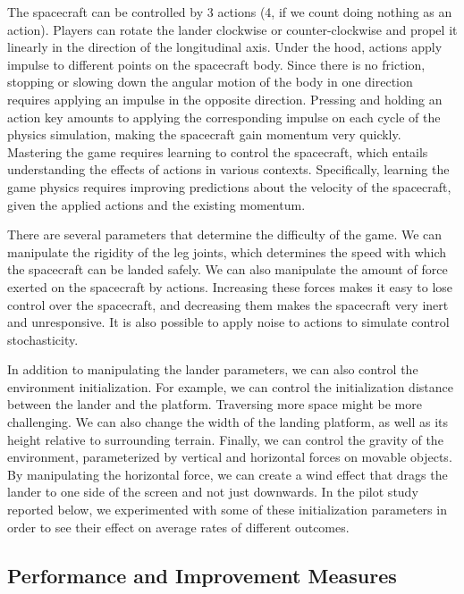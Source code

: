 The spacecraft can be controlled by 3 actions (4, if we count doing nothing as an action). Players can rotate the lander clockwise or counter-clockwise and propel it linearly in the direction of the longitudinal axis. Under the hood, actions apply impulse to different points on the spacecraft body. Since there is no friction, stopping or slowing down the angular motion of the body in one direction requires applying an impulse in the opposite direction. Pressing and holding an action key amounts to applying the corresponding impulse on each cycle of the physics simulation, making the spacecraft gain momentum very quickly. Mastering the game requires learning to control the spacecraft, which entails understanding the effects of actions in various contexts. Specifically, learning the game physics requires improving predictions about the velocity of the spacecraft, given the applied actions and the existing momentum.

There are several parameters that determine the difficulty of the game. We can manipulate the rigidity of the leg joints, which determines the speed with which the spacecraft can be landed safely. We can also manipulate the amount of force exerted on the spacecraft by actions. Increasing these forces makes it easy to lose control over the spacecraft, and decreasing them makes the spacecraft very inert and unresponsive. It is also possible to apply noise to actions to simulate control stochasticity.

In addition to manipulating the lander parameters, we can also control the environment initialization. For example, we can control the initialization distance between the lander and the platform. Traversing more space might be more challenging. We can also change the width of the landing platform, as well as its height relative to surrounding terrain. Finally, we can control the gravity of the environment, parameterized by vertical and horizontal forces on movable objects. By manipulating the horizontal force, we can create a wind effect that drags the lander to one side of the screen and not just downwards. In the pilot study reported below, we experimented with some of these initialization parameters in order to see their effect on average rates of different outcomes.

\subsection{Performance and Improvement Measures}

